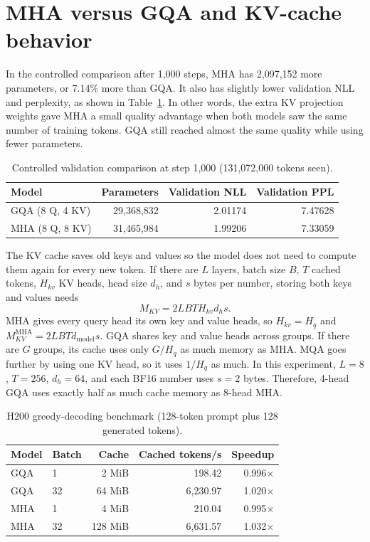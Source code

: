 \documentclass[10pt]{article}
\begin{document}
\section{MHA versus GQA and KV-cache behavior}

In the controlled comparison after 1,000 steps, MHA has 2,097,152 more parameters, or 7.14\% more
than GQA. It also has slightly lower validation NLL and perplexity, as shown in
Table~\ref{tab:quality}. In other words, the extra KV projection weights gave MHA a small quality
advantage when both models saw the same number of training tokens. GQA still reached almost the
same quality while using fewer parameters.

\begin{table}[ht]
\centering
\small
\caption{Controlled validation comparison at step 1,000 (131,072,000 tokens seen).}
\label{tab:quality}
\begin{tabular}{lrrr}
\toprule
Model & Parameters & Validation NLL & Validation PPL \\
\midrule
GQA (8 Q, 4 KV) & 29,368,832 & 2.01174 & 7.47628 \\
MHA (8 Q, 8 KV) & 31,465,984 & 1.99206 & 7.33059 \\
\bottomrule
\end{tabular}
\end{table}

The KV cache saves old keys and values so the model does not need to compute them again for every
new token. If there are $L$ layers, batch size $B$, $T$ cached tokens, $H_{kv}$ KV heads, head size
$d_h$, and $s$ bytes per number, storing both keys and values needs
\[
M_{KV}=2LBTH_{kv}d_hs.
\]
MHA gives every query head its own key and value heads, so $H_{kv}=H_q$ and
$M_{KV}^{\mathrm{MHA}}=2LBTd_{\mathrm{model}}s$. GQA shares key and value heads across groups. If
there are $G$ groups, its cache uses only $G/H_q$ as much memory as MHA. MQA goes further by using
one KV head, so it uses $1/H_q$ as much. In this experiment, $L=8$, $T=256$, $d_h=64$, and each
BF16 number uses $s=2$ bytes. Therefore, 4-head GQA uses exactly half as much cache memory as
8-head MHA.

\begin{table}[ht]
\centering
\small
\caption{H200 greedy-decoding benchmark (128-token prompt plus 128 generated tokens).}
\label{tab:cache}
\begin{tabular}{llrrr}
\toprule
Model & Batch & Cache & Cached tokens/s & Speedup \\
\midrule
GQA & 1  & 2 MiB   & 198.42  & 0.996$\times$ \\
GQA & 32 & 64 MiB  & 6,230.97 & 1.020$\times$ \\
MHA & 1  & 4 MiB   & 210.04  & 0.995$\times$ \\
MHA & 32 & 128 MiB & 6,631.57 & 1.032$\times$ \\
\bottomrule
\end{tabular}
\end{table}
\end{document}
